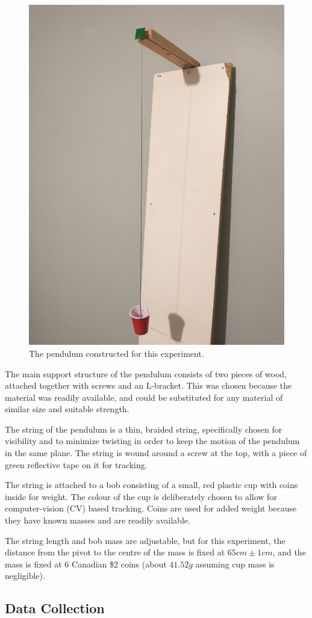 \documentclass[aps,twocolumn,secnumarabic,nobalancelastpage,amsmath,amssymb,nofootinbib]{revtex4}
\begin{document}
\begin{figure}[htb]
    \includegraphics[width=0.6\linewidth]{pendulum.png}
    \caption{The pendulum constructed for this experiment.}
\end{figure}

The main support structure of the pendulum consists of two pieces of wood, attached together with screws and an
L-bracket. This was chosen because the material was readily available, and could be substituted for any material of
similar size and suitable strength.

The string of the pendulum is a thin, braided string, specifically chosen for visibility and to minimize twisting in
order to keep the motion of the pendulum in the same plane. The string is wound around a screw at the top, with a piece
of green reflective tape on it for tracking.

The string is attached to a bob consisting of a small, red plastic cup with coins inside for weight. The colour of the
cup is deliberately chosen to allow for computer-vision (CV) based tracking. Coins are used for added weight because
they have known masses and are readily available.

The string length and bob mass are adjustable, but for this experiment, the distance from the pivot to the centre of the
mass is fixed at \(65\si{cm} \pm 1\si{cm}\), and the mass is fixed at 6 Canadian \$2 coins (about \(41.52\si{g}\)
assuming cup mass is negligible).

\subsection{Data Collection}
\end{document}
